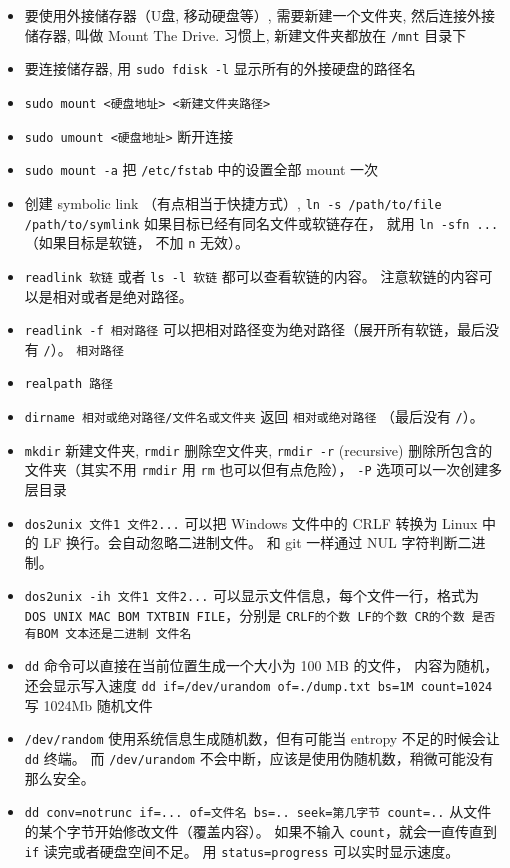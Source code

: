 \begin{itemize}
\item 要使用外接储存器（U盘, 移动硬盘等）, 需要新建一个文件夹, 然后连接外接储存器, 叫做 Mount The Drive. 习惯上, 新建文件夹都放在 \verb`/mnt` 目录下
\item 要连接储存器, 用 \verb`sudo fdisk -l` 显示所有的外接硬盘的路径名
\item \verb`sudo mount <硬盘地址> <新建文件夹路径>`
\item \verb`sudo umount <硬盘地址>` 断开连接
\item \verb`sudo mount -a` 把 \verb`/etc/fstab` 中的设置全部 mount 一次
\item 创建 symbolic link （有点相当于快捷方式）, \verb`ln -s /path/to/file /path/to/symlink` 如果目标已经有同名文件或软链存在， 就用 \verb`ln -sfn ...` （如果目标是软链， 不加 \verb`n` 无效）。
\item \verb`readlink 软链` 或者 \verb`ls -l 软链` 都可以查看软链的内容。 注意软链的内容可以是相对或者是绝对路径。
\item \verb`readlink -f 相对路径` 可以把相对路径变为绝对路径（展开所有软链，最后没有 \verb`/`）。 \verb`相对路径`
\item \verb`realpath 路径`
\item \verb`dirname 相对或绝对路径/文件名或文件夹` 返回 \verb`相对或绝对路径` （最后没有 \verb`/`）。
\item \verb`mkdir` 新建文件夹, \verb`rmdir` 删除空文件夹, \verb`rmdir -r` (recursive) 删除所包含的文件夹（其实不用 \verb`rmdir` 用 \verb`rm` 也可以但有点危险）， \verb`-P` 选项可以一次创建多层目录
\item \verb`dos2unix 文件1 文件2...` 可以把 Windows 文件中的 CRLF 转换为 Linux 中的 LF 换行。会自动忽略二进制文件。 和 git 一样通过 NUL 字符判断二进制。
\item \verb`dos2unix -ih 文件1 文件2...` 可以显示文件信息，每个文件一行，格式为 \verb`DOS UNIX MAC BOM TXTBIN FILE`，分别是 \verb`CRLF的个数 LF的个数 CR的个数 是否有BOM 文本还是二进制 文件名`
\item \verb`dd` 命令可以直接在当前位置生成一个大小为 100 MB 的文件， 内容为随机， 还会显示写入速度
\verb`dd if=/dev/urandom of=./dump.txt bs=1M count=1024` 写 1024Mb 随机文件
\item \verb`/dev/random` 使用系统信息生成随机数，但有可能当 entropy 不足的时候会让 \verb`dd` 终端。 而 \verb`/dev/urandom` 不会中断，应该是使用伪随机数，稍微可能没有那么安全。
\item \verb`dd conv=notrunc if=... of=文件名 bs=.. seek=第几字节 count=..`  从文件的某个字节开始修改文件（覆盖内容）。 如果不输入 \verb`count`，就会一直传直到 \verb`if` 读完或者硬盘空间不足。 用 \verb`status=progress` 可以实时显示速度。

\end{itemize}
